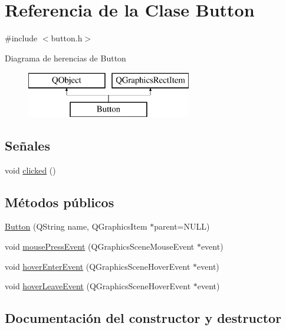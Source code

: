\hypertarget{class_button}{}\section{Referencia de la Clase Button}
\label{class_button}


{\ttfamily \#include $<$button.\+h$>$}

Diagrama de herencias de Button\begin{figure}[H]
\begin{center}
\leavevmode
\includegraphics[height=2.000000cm]{class_button}
\end{center}
\end{figure}
\subsection*{Señales}
\begin{DoxyCompactItemize}
\item 
void \hyperlink{class_button_a9e7ab4152cb1e7e3beb7f2842f32670c}{clicked} ()
\end{DoxyCompactItemize}
\subsection*{Métodos públicos}
\begin{DoxyCompactItemize}
\item 
\hyperlink{class_button_a69976e5c00874a3807b642f249c1c776}{Button} (Q\+String name, Q\+Graphics\+Item $\ast$parent=N\+U\+LL)
\item 
void \hyperlink{class_button_a17d8eb0c904605b223bbc00c75655315}{mouse\+Press\+Event} (Q\+Graphics\+Scene\+Mouse\+Event $\ast$event)
\item 
void \hyperlink{class_button_a633a9684818bc5d300a622a00064f09c}{hover\+Enter\+Event} (Q\+Graphics\+Scene\+Hover\+Event $\ast$event)
\item 
void \hyperlink{class_button_a1689a97690d9469ce8350d24db0d7485}{hover\+Leave\+Event} (Q\+Graphics\+Scene\+Hover\+Event $\ast$event)
\end{DoxyCompactItemize}


\subsection{Documentación del constructor y destructor}
\hypertarget{class_button_a69976e5c00874a3807b642f249c1c776}{}\label{class_button_a69976e5c00874a3807b642f249c1c776} 

